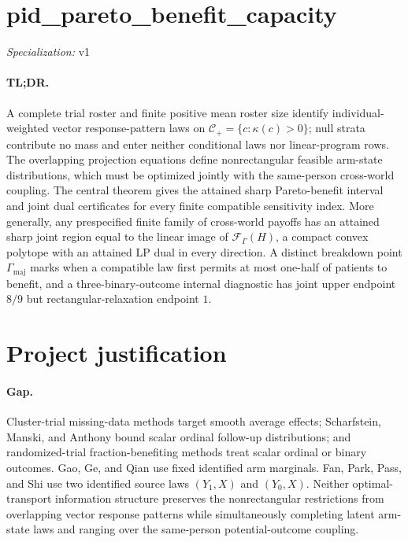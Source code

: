\documentclass{article}
\begin{document}
\sloppy

\section*{pid\_\allowbreak{}pareto\_\allowbreak{}benefit\_\allowbreak{}capacity}

\noindent\textit{Specialization:} v1\par

\paragraph{TL;DR.} A complete trial roster and finite positive mean roster size identify individual-weighted vector response-pattern laws on \(\mathcal C_{+}=\{c:\kappa(c)>0\}\); null strata contribute no mass and enter neither conditional laws nor linear-program rows. The overlapping projection equations define nonrectangular feasible arm-state distributions, which must be optimized jointly with the same-person cross-world coupling. The central theorem gives the attained sharp Pareto-benefit interval and joint dual certificates for every finite compatible sensitivity index. More generally, any prespecified finite family of cross-world payoffs has an attained sharp joint region equal to the linear image of \(\mathcal F_{\Gamma}(H)\), a compact convex polytope with an attained LP dual in every direction. A distinct breakdown point \(\Gamma_{\mathrm{maj}}\) marks when a compatible law first permits at most one-half of patients to benefit, and a three-binary-outcome internal diagnostic has joint upper endpoint \(8/9\) but rectangular-relaxation endpoint \(1\).

\section{Project justification}

\paragraph{Gap.} Cluster-trial missing-data methods target smooth average effects; Scharfstein, Manski, and Anthony bound scalar ordinal follow-up distributions; and randomized-trial fraction-benefiting methods treat scalar ordinal or binary outcomes. Gao, Ge, and Qian use fixed identified arm marginals. Fan, Park, Pass, and Shi use two identified source laws \((Y_1,X)\) and \((Y_0,X)\). Neither optimal-transport information structure preserves the nonrectangular restrictions from overlapping vector response patterns while simultaneously completing latent arm-state laws and ranging over the same-person potential-outcome coupling.
\end{document}
